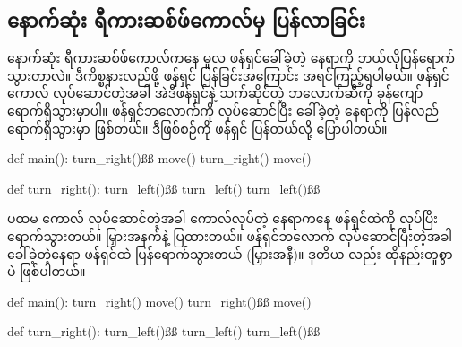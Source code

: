 \subsection*{နောက်ဆုံး ရီကားဆစ်ဖ်ကောလ်မှ ပြန်လာခြင်း}
နောက်ဆုံး ရီကားဆစ်ဖ်ကောလ်ကနေ မူလ ဖန်ရှင်ခေါ်ခဲ့တဲ့ နေရာကို ဘယ်လိုပြန်ရောက်သွားတာလဲ။ ဒီကိစ္စနားလည်ဖို့ ဖန်ရှင်  ပြန်ခြင်းအကြောင်း အရင်ကြည့်ရပါမယ်။ ဖန်ရှင်ကောလ် လုပ်ဆောင်တဲ့အခါ အဲဒီဖန်ရှင်နဲ့ သက်ဆိုင်တဲ့ ဘလောက်ဆီကို ခုန်ကျော် ရောက်ရှိသွားမှာပါ။ ဖန်ရှင်ဘလောက်ကို လုပ်ဆောင်ပြီး ခေါ်ခဲ့တဲ့ နေရာကို ပြန်လည်ရောက်ရှိသွားမှာ ဖြစ်တယ်။ ဒီဖြစ်စဉ်ကို ဖန်ရှင်  ပြန်တယ်လို့ ပြောပါတယ်။
\clearpage
%
\begin{py}
def main():
    turn_right()ßß
    move()
    turn_right()
    move()

def turn_right():
    turn_left()ßß
    turn_left()
    turn_left()ßß
\end{py}
%
ပထမ  ကောလ် လုပ်ဆောင်တဲ့အခါ ကောလ်လုပ်တဲ့ နေရာကနေ  ဖန်ရှင်ထဲကို  လုပ်ပြီး ရောက်သွားတယ်။ မြှားအနက်နဲ့ ပြထားတယ်။ ဖန်ရှင်ဘလောက် လုပ်ဆောင်ပြီးတဲ့အခါ ခေါ်ခဲ့တဲ့နေရာ  ဖန်ရှင်ထဲ ပြန်ရောက်သွားတယ် (မြှားအနီ)။ ဒုတိယ  လည်း ထိုနည်းတူစွာပဲ ဖြစ်ပါတယ်။


%
\begin{py}
def main():
    turn_right()
    move()
    turn_right()ßß
    move()

def turn_right():
    turn_left()ßß
    turn_left()
    turn_left()ßß
\end{py}
\btwntikzannoandpar

